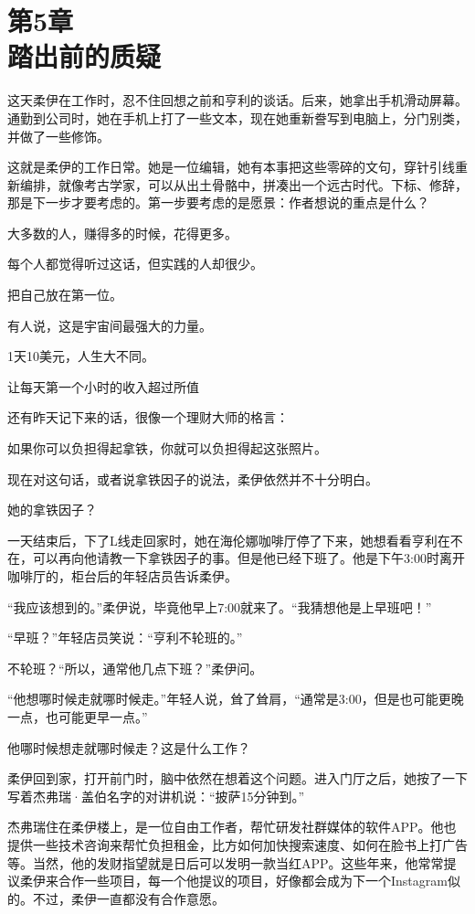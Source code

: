 \section[第5章\q 踏出前的质疑]{第5章\\ 踏出前的质疑}
\label{sec:ch5}

这天柔伊在工作时，忍不住回想之前和亨利的谈话。后来，她拿出手机滑动屏幕。通勤到公司时，她在手机上打了一些文本，现在她重新誊写到电脑上，分门别类，并做了一些修饰。

这就是柔伊的工作日常。她是一位编辑，她有本事把这些零碎的文句，穿针引线重新编排，就像考古学家，可以从出土骨骼中，拼凑出一个远古时代。下标、修辞，那是下一步才要考虑的。第一步要考虑的是愿景：作者想说的重点是什么？

{\kaishu 大多数的人，赚得多的时候，花得更多。}

{\kaishu 每个人都觉得听过这话，但实践的人却很少。}

{\kaishu 把自己放在第一位。}

{\kaishu 有人说，这是宇宙间最强大的力量。}

{\kaishu 1天10美元，人生大不同。}

{\kaishu 让每天第一个小时的收入超过所值}

还有昨天记下来的话，很像一个理财大师的格言：

{\kaishu 如果你可以负担得起拿铁，你就可以负担得起这张照片。}

现在对这句话，或者说拿铁因子的说法，柔伊依然并不十分明白。

她的拿铁因子？

一天结束后，下了L线走回家时，她在海伦娜咖啡厅停了下来，她想看看亨利在不在，可以再向他请教一下拿铁因子的事。但是他已经下班了。他是下午3:00时离开咖啡厅的，柜台后的年轻店员告诉柔伊。

“我应该想到的。”柔伊说，毕竟他早上7:00就来了。“我猜想他是上早班吧！”

“早班？”年轻店员笑说：“亨利不轮班的。”

不轮班？“所以，通常他几点下班？”柔伊问。

“他想哪时候走就哪时候走。”年轻人说，耸了耸肩，“通常是3:00，但是也可能更晚一点，也可能更早一点。”

他哪时候想走就哪时候走？这是什么工作？

柔伊回到家，打开前门时，脑中依然在想着这个问题。进入门厅之后，她按了一下写着杰弗瑞·盖伯名字的对讲机说：“披萨15分钟到。”

杰弗瑞住在柔伊楼上，是一位自由工作者，帮忙研发社群媒体的软件APP。他也提供一些技术咨询来帮忙负担租金，比方如何加快搜索速度、如何在脸书上打广告等。当然，他的发财指望就是日后可以发明一款当红APP。这些年来，他常常提议柔伊来合作一些项目，每一个他提议的项目，好像都会成为下一个Instagram似的。不过，柔伊一直都没有合作意愿。

